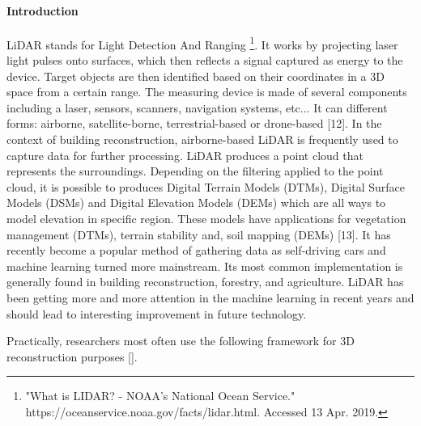 \documentclass[12pt]{report}
\begin{document}
\vspace{\baselineskip}

\vspace{\baselineskip}
\paragraph*{Introduction}

\vspace{\baselineskip}
LiDAR stands for Light Detection And Ranging \footnote{ "What is LIDAR? - NOAA's National Ocean Service." https://oceanservice.noaa.gov/facts/lidar.html. Accessed 13 Apr. 2019. }. It works by projecting laser light pulses onto surfaces, which then reflects a signal captured as energy to the device. Target objects are then identified based on their coordinates in a 3D space from a certain range. The measuring device is made of several components including a laser, sensors, scanners, navigation systems, etc... It can different forms: airborne, satellite-borne, terrestrial-based or drone-based [12]. In the context of building reconstruction, airborne-based LiDAR is frequently used to capture data for further processing. LiDAR produces a point cloud that represents the surroundings. Depending on the filtering applied to the point cloud, it is possible to produces Digital Terrain Models (DTMs), Digital Surface Models (DSMs) and Digital Elevation Models (DEMs) which are all ways to model elevation in specific region. These models have applications for vegetation management (DTMs), terrain stability and, soil mapping (DEMs) [13]. It has recently become a popular method of gathering data as self-driving cars and machine learning turned more mainstream. Its most common implementation is generally found in building reconstruction, forestry, and agriculture. LiDAR has been getting more and more attention in the machine learning in recent years and should lead to interesting improvement in future technology. \par


\vspace{\baselineskip}
Practically, researchers most often use the following framework for 3D reconstruction purposes [].\par


\vspace{\baselineskip}


\end{document}

